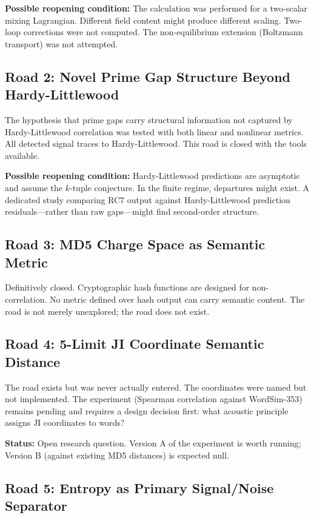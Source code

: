 \documentclass[11pt]{article}
\begin{document}
\textbf{Possible reopening condition:} The calculation was performed for a two-scalar mixing Lagrangian. Different field content might produce different scaling. Two-loop corrections were not computed. The non-equilibrium extension (Boltzmann transport) was not attempted.

\subsection{Road 2: Novel Prime Gap Structure Beyond Hardy-Littlewood}

The hypothesis that prime gaps carry structural information not captured by Hardy-Littlewood correlation was tested with both linear and nonlinear metrics. All detected signal traces to Hardy-Littlewood. This road is closed with the tools available.

\textbf{Possible reopening condition:} Hardy-Littlewood predictions are asymptotic and assume the $k$-tuple conjecture. In the finite regime, departures might exist. A dedicated study comparing RC7 output against Hardy-Littlewood prediction residuals---rather than raw gaps---might find second-order structure.

\subsection{Road 3: MD5 Charge Space as Semantic Metric}

Definitively closed. Cryptographic hash functions are designed for non-correlation. No metric defined over hash output can carry semantic content. The road is not merely unexplored; the road does not exist.

\subsection{Road 4: 5-Limit JI Coordinate Semantic Distance}

The road exists but was never actually entered. The coordinates were named but not implemented. The experiment (Spearman correlation against WordSim-353) remains pending and requires a design decision first: what acoustic principle assigns JI coordinates to words?

\textbf{Status:} Open research question. Version A of the experiment is worth running; Version B (against existing MD5 distances) is expected null.

\subsection{Road 5: Entropy as Primary Signal/Noise Separator}
\end{document}
